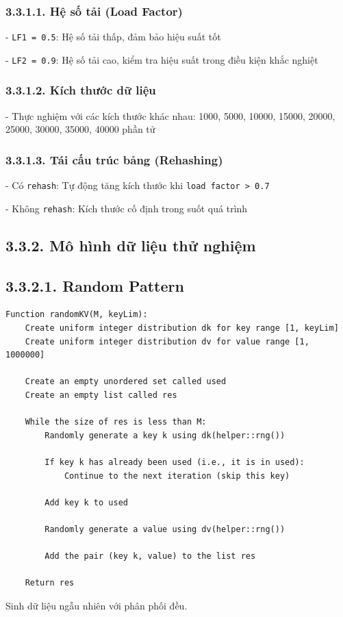 \documentclass[12pt,a4paper]{report}
\begin{document}
\subsubsection*{3.3.1.1. Hệ số tải (Load Factor)}

\noindent \indent - \texttt{LF1 = 0.5}: Hệ số tải thấp, đảm bảo hiệu suất tốt

- \texttt{LF2 = 0.9}: Hệ số tải cao, kiểm tra hiệu suất trong điều kiện khắc nghiệt

\subsubsection*{3.3.1.2. Kích thước dữ liệu}

\noindent \indent - Thực nghiệm với các kích thước khác nhau: 1000, 5000, 10000, 15000, 20000, 25000, 30000, 35000, 40000 phần tử

\subsubsection*{3.3.1.3. Tái cấu trúc bảng (Rehashing)}

\noindent \indent - Có \texttt{rehash}: Tự động tăng kích thước khi \texttt{load factor > 0.7}

- Không \texttt{rehash}: Kích thước cố định trong suốt quá trình

\subsection*{3.3.2. Mô hình dữ liệu thử nghiệm}

\subsection*{3.3.2.1. Random Pattern}
\begin{lstlisting}[style=numbered]
Function randomKV(M, keyLim):
    Create uniform integer distribution dk for key range [1, keyLim]
    Create uniform integer distribution dv for value range [1, 1000000]

    Create an empty unordered set called used
    Create an empty list called res

    While the size of res is less than M:
        Randomly generate a key k using dk(helper::rng())
        
        If key k has already been used (i.e., it is in used):
            Continue to the next iteration (skip this key)

        Add key k to used

        Randomly generate a value using dv(helper::rng())

        Add the pair (key k, value) to the list res

    Return res
\end{lstlisting}
Sinh dữ liệu ngẫu nhiên với phân phối đều.
\end{document}
